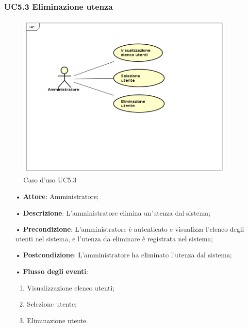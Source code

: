 \subsubsection{UC5.3 Eliminazione utenza}


\begin{figure}[H]
\centering
\includegraphics[width=11cm]{img/UC53.png} 
\caption{Caso d'uso UC5.3}
\end{figure}


\begin{itemize}
\item[•] \textbf{Attore}: Amministratore;

\item[•] \textbf{Descrizione}: L’amministratore elimina un’utenza dal sistema;

\item[•] \textbf{Precondizione}: L’amministratore \`{e} autenticato e visualizza l’elenco degli utenti nel sistema, e l’utenza da eliminare \`{e} registrata nel sistema;

\item[•] \textbf{Postcondizione}: L’amministratore ha eliminato l’utenza dal sistema; 

\item[•] \textbf{Flusso degli eventi}:

\begin{enumerate}

\item Visualizzazione elenco utenti;

\item Selezione utente;

\item Eliminazione utente.

\end{enumerate}

\end{itemize}
